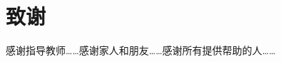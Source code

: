 \documentclass
  [
    math-font    = STIX Two Math, agreed,
    CJKmain-font = { {Source Han Serif CN}[AutoFakeBold = 2.5, AutoFakeSlant] },
    CJKsans-font = { {Source Han Sans CN}[AutoFakeBold = 2] }
  ] {hduthesis}
\begin{document}





\chapter*{致\qquad 谢}

感谢指导教师……感谢家人和朋友……感谢所有提供帮助的人……

\printbibliography
\end{document}
